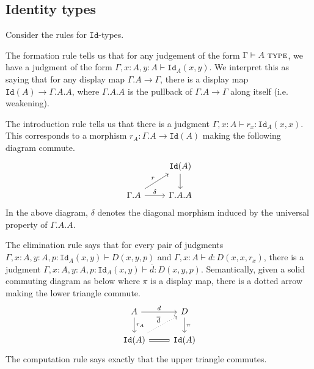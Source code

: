 \documentclass{article}
\theoremstyle{definition}
\newcommand{\type}{\ \textsc{type}}
\newcommand{\Id}{\mathtt {Id}}
\begin{document}
\subsection{Identity types}

Consider the rules for $\Id$-types.

The formation rule tells us that for any judgement of the form $\Gamma \vdash A \type$, we have a judgment of the form $\Gamma, x : A, y : A \vdash \Id_A(x,y)$.
We interpret this as saying that for any display map $\Gamma . A \to \Gamma$, there is a display map $\Id(A) \to \Gamma . A . A$, where $\Gamma. A . A$ is the pullback of $\Gamma . A \to \Gamma$ along itself (i.e. weakening).

The introduction rule tells us that there is a judgment $\Gamma, x : A \vdash r_x : \Id_A (x,x)$.
This corresponds to a morphism $r_A : \Gamma . A \to \Id(A)$ making the following diagram commute.
\[
     \begin{tikzcd}
          & \Id(A) \ar[d] \\
          \Gamma . A \ar[ru,"r"] \ar[r,"\delta"] & \Gamma.A.A
     \end{tikzcd}
\]
In the above diagram, $\delta$ denotes the diagonal morphism induced by the universal property of $\Gamma.A.A$.

The elimination rule says that for every pair of judgments $\Gamma, x : A, y : A, p : \Id_A(x,y) \vdash D(x,y,p)$ and $\Gamma, x : A \vdash d : D(x,x,r_x)$, there is a judgment $\Gamma, x : A, y : A, p : \Id_A(x,y) \vdash \overline d : D(x,y,p)$. Semantically, given a solid commuting diagram as below where $\pi$ is a display map, there is a dotted arrow making the lower triangle commute.
\[
     \begin{tikzcd}
         A \ar[r,"d"] \ar[d,"r_A"] & D \ar[d,"\pi"]
         \\ 
         \Id(A) \ar[r,equal] \ar[ur,"\overline d", dotted] & \Id(A)
     \end{tikzcd}
\]
The computation rule says exactly that the upper triangle commutes.
\end{document}
